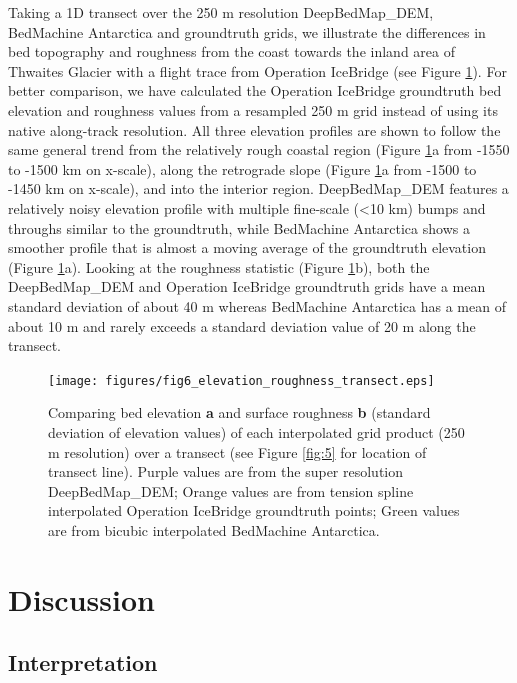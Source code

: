 \documentclass[tc, manuscript]{copernicus}
\begin{document}
Taking a 1D transect over the 250 m resolution DeepBedMap\_DEM, BedMachine Antarctica and groundtruth grids, we illustrate the differences in bed topography and roughness from the coast towards the inland area of Thwaites Glacier with a flight trace from Operation IceBridge (see Figure \ref{fig:6}).
For better comparison, we have calculated the Operation IceBridge groundtruth bed elevation and roughness values from a resampled 250 m grid instead of using its native along-track resolution.
All three elevation profiles are shown to follow the same general trend from the relatively rough coastal region (Figure \ref{fig:6}a from -1550 to -1500 km on x-scale), along the retrograde slope (Figure \ref{fig:6}a from -1500 to -1450 km on x-scale), and into the interior region.
DeepBedMap\_DEM features a relatively noisy elevation profile with multiple fine-scale (<10 km) bumps and throughs similar to the groundtruth, while BedMachine Antarctica shows a smoother profile that is almost a moving average of the groundtruth elevation (Figure \ref{fig:6}a).
Looking at the roughness statistic (Figure \ref{fig:6}b), both the DeepBedMap\_DEM and Operation IceBridge groundtruth grids have a mean standard deviation of about 40 m whereas BedMachine Antarctica has a mean of about 10 m and rarely exceeds a standard deviation value of 20 m along the transect.

\begin{figure}[htbp]
  \texttt{[image: figures/fig6\_elevation\_roughness\_transect.eps]}
  \caption{
    Comparing bed elevation \textbf{a} and surface roughness \textbf{b} (standard deviation of elevation values) of each interpolated grid product (250 m resolution) over a transect (see Figure \ref{fig:5} for location of transect line).
    Purple values are from the super resolution DeepBedMap\_DEM;
    Orange values are from tension spline interpolated Operation IceBridge groundtruth points;
    Green values are from bicubic interpolated BedMachine Antarctica.
  }
  \label{fig:6}
\end{figure}


\section{Discussion}

\subsection{Interpretation}
\end{document}
